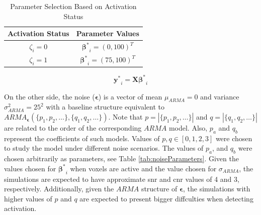 \begin{table}[htbp!]
\centering
\caption{Parameter Selection Based on Activation Status}
\begin{tabular}{cc}
\hline
\textbf{Activation Status} & \textbf{Parameter Values} \\ \hline
$\zeta_i=0$ & $\bm{\beta^*}_i = (0,100)^T$ \\
$\zeta_i=1$ & $\bm{\beta^*}_i = (75,100)^T$ \\ \hline
\end{tabular}
\label{tab:betaParameter}
\end{table}

\begin{equation} \label{eq:boldCleanCalc}
\bm{y^*}_i = \bm{X}\bm{\beta^*}_i
\end{equation}

On the other side, the noise ($\bm{\epsilon}$) is a vector of mean $\mu_{ARMA} = 0$ and 
variance $\sigma_{ARMA}^2=25^2$ with a baseline structure equivalent to 
${ARMA}_{\bm{\epsilon}}\left( \{p_1,p_2,\dots\},\{q_1,q_2,\dots\} \right)$. 
Note that $p = \left| \{p_1,p_2,\dots\} \right|$ and $q= \left| \{q_1,q_2,\dots\} \right|$ 
are related to the order of the corresponding $ARMA$ model. Also, $p_a$ and $q_b$ represent 
the coefficients of such models. Values of $p,q \in [0,1,2,3]$ were chosen to 
study the model under different noise scenarios. The values of $p_a$, 
and $q_b$ were chosen arbitrarily as parameters, see Table \ref{tab:noiseParameters}. Given the
values chosen for $\bm{\beta^*}_i$ when voxels are active and the value chosen for $\sigma_{ARMA}$,
the simulations are expected to have approximate \gls{snr} and \gls{cnr} values of 4 and 3, respectively.
Additionally, given the $ARMA$ structure of $\bm{\epsilon}$, the simulations with higher values of $p$ and
$q$ are expected to present bigger diffculties when detecting activation.

